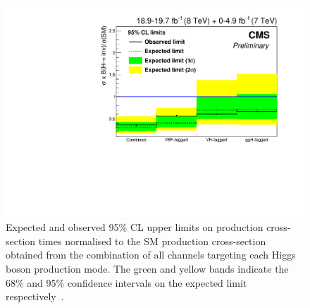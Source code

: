 \begin{figure}
  \includegraphics[width=\largefigwidth]{plots/comb/HIG-15-012-figs/channellimit.pdf}
  \caption{Expected and observed 95\% \ac{CL} upper limits on production cross-section times \BRinv normalised to the \ac{SM} production cross-section obtained from the combination of all channels targeting each Higgs boson production mode. The green and yellow bands indicate the 68\% and 95\% confidence intervals on the expected limit respectively~\cite{CMS-PAS-HIG-15-012}.}
  \label{fig:parkedcombchannel}
\end{figure}

